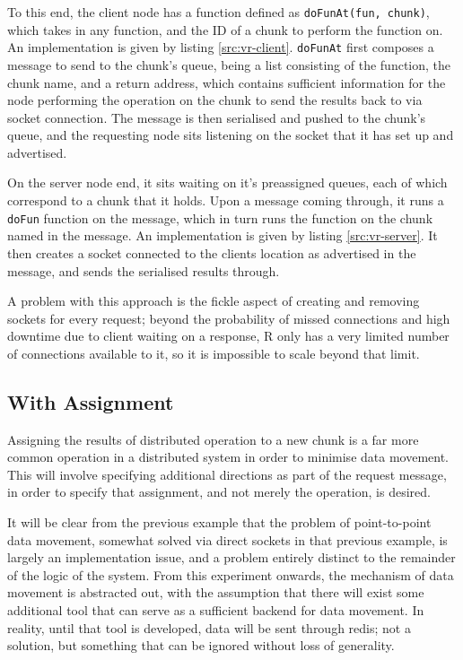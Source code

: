\documentclass[a4paper,10pt]{article}
\begin{document}
To this end, the client node has a function defined as \texttt{doFunAt(fun,
chunk)}, which takes in any function, and the ID of a chunk to perform the
function on.
An implementation is given by listing \ref{src:vr-client}.
\texttt{doFunAt} first composes a message to send to the chunk's queue, being a
list consisting of the function, the chunk name, and a return address, which
contains sufficient information for the node performing the operation on the
chunk to send the results back to via socket connection.
The message is then serialised and pushed to the chunk's queue, and the
requesting node sits listening on the socket that it has set up and advertised.

On the server node end, it sits waiting on it's preassigned queues, each of
which correspond to a chunk that it holds. 
Upon a message coming through, it runs a \texttt{doFun} function on the
message, which in turn runs the function on the chunk named in the message. 
An implementation is given by listing \ref{src:vr-server}.
It then creates a socket connected to the clients location as advertised in
the message, and sends the serialised results through.

A problem with this approach is the fickle aspect of creating and removing
sockets for every request; beyond the probability of missed connections and
high downtime due to client waiting on a response, R only has a very limited
number of connections available to it, so it is impossible to scale beyond that
limit.

\subsection{With Assignment}

Assigning the results of distributed operation to a new chunk is a far more
common operation in a distributed system in order to minimise data movement.
This will involve specifying additional directions as part of the request
message, in order to specify that assignment, and not merely the operation, is
desired.

It will be clear from the previous example that the problem of point-to-point
data movement, somewhat solved via direct sockets in that previous example, is
largely an implementation issue, and a problem entirely distinct to the
remainder of the logic of the system.
From this experiment onwards, the mechanism of data movement is abstracted out,
with the assumption that there will exist some additional tool that can serve
as a sufficient backend for data movement.
In reality, until that tool is developed, data will be sent through redis; not
a solution, but something that can be ignored without loss of generality.
\end{document}

